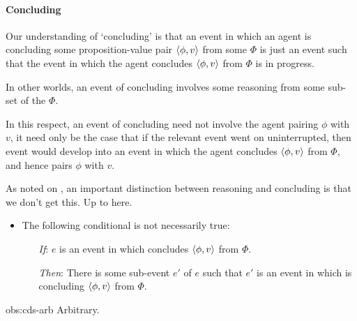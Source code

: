 \paragraph{Concluding}

\begin{note}
  Our understanding of `concluding' is that an event in which an agent is concluding some proposition-value pair \(\langle \phi, v \rangle\) from some \poP{} \(\Phi\) is just an event such that the event in which the agent concludes \(\langle \phi, v \rangle\) from \(\Phi\) is in progress.

  In other worlds, an event of concluding involves some reasoning from some sub-set of the \poP{} \(\Phi\).

  In this respect, an event of concluding need not involve the agent pairing \(\phi\) with \(v\), it need only be the case that if the relevant event went on uninterrupted, then event would develop into an event in which the agent concludes \(\langle \phi, v \rangle\) from \(\Phi\), and hence pairs \(\phi\) with \(v\).

  As noted on , an important distinction between reasoning and concluding is that we don't get this.
  {
    \color{red} Up to here.
  }
\end{note}

\begin{note}
  \begin{observation}
    \label{obs:cds-arb}

    \begin{itemize}
    \item
      The following conditional is not necessarily true:
      \begin{itemize}
      \item[\emph{If}:]
        \(e\) is an event in which \vAgent{} concludes \(\langle \phi, v \rangle\) from \(\Phi\).
      \item[\emph{Then}:]
        There is some sub-event \(e'\) of \(e\) such that \(e'\) is an event in which \vAgent{} is concluding \(\langle \phi, v \rangle\) from \(\Phi\).
      \end{itemize}
    \end{itemize}
  \end{observation}

  \begin{argument}{obs:cds-arb}
    Arbitrary.
  \end{argument}
\end{note}


